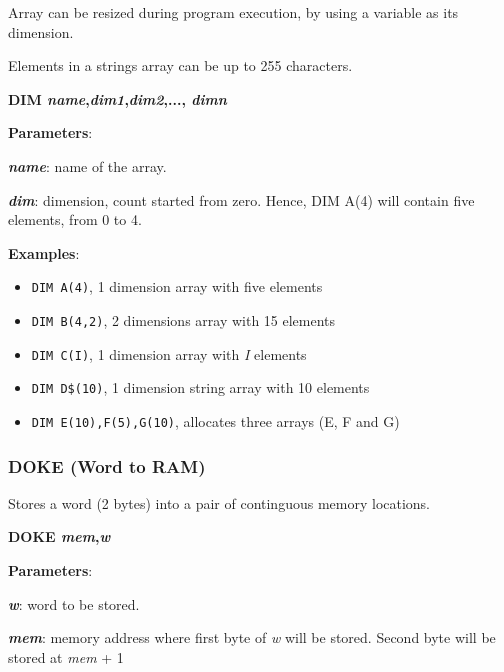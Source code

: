    Array can be resized during program execution, by using a variable as its
    dimension.

    Elements in a strings array can be up to 255 characters.

    \hspace{1.9cm}\textbf{DIM \textit{name},\textit{dim1},\textit{dim2},...,
    \textit{dimn}}

    \textbf{Parameters}:

    \hspace{1cm}\textbf{\textit{name}}: name of the array.

    \hspace{1cm}\textbf{\textit{dim}}: dimension, count started from zero. Hence,
    DIM A(4) will contain five elements, from 0 to 4.

    \textbf{Examples}:
    \begin{itemize}
        \item \texttt{DIM A(4)}, 1 dimension array with five elements
        \item \texttt{DIM B(4,2)}, 2 dimensions array with 15 elements
        \item \texttt{DIM C(I)}, 1 dimension array with \textit{I} elements
        \item \texttt{DIM D\$(10)}, 1 dimension string array with 10 elements
        \item \texttt{DIM E(10),F(5),G(10)}, allocates three arrays (E, F and G)
    \end{itemize}

    \subsubsection{{DOKE (Word to RAM)}}
    \label{msbasic:lang:doke}
    Stores a word (2 bytes) into a pair of continguous memory locations.

    \hspace{1.9cm}\textbf{DOKE \textit{mem},\textit{w}}

    \textbf{Parameters}:

    \hspace{1cm}\textbf{\textit{w}}: word to be stored.

    \hspace{1cm}\textbf{\textit{mem}}: memory address where first byte of
    \textit{w} will be stored. Second byte will be stored at \textit{mem} + 1

